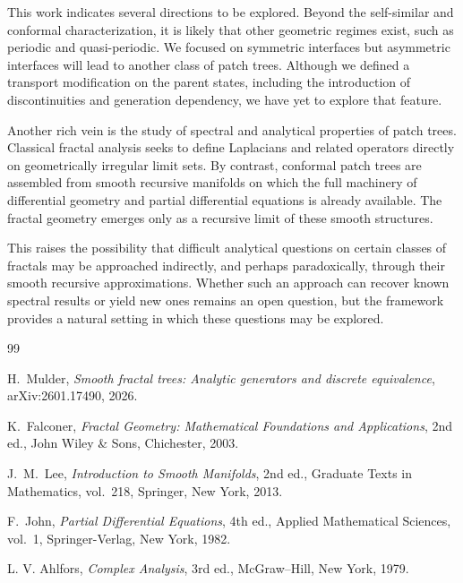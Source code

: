 \documentclass[11pt,a4paper]{article}
\begin{document}
This work indicates several directions to be explored. Beyond the self-similar and conformal
characterization, it is likely that other geometric regimes exist, such as periodic and 
quasi-periodic. We focused on symmetric interfaces but asymmetric interfaces will lead to another 
class of patch trees. Although we defined a transport modification on the parent states, 
including the introduction of discontinuities and generation dependency, we have yet to explore
that feature.

Another rich vein is the study of spectral and analytical
properties of patch trees. Classical fractal analysis seeks to define
Laplacians and related operators directly on geometrically irregular
limit sets. By contrast, conformal patch trees are assembled from
smooth recursive manifolds on which the full machinery of differential
geometry and partial differential equations is already available. The
fractal geometry emerges only as a recursive limit of these smooth
structures.

This raises the possibility that difficult analytical questions on
certain classes of fractals may be approached indirectly, and perhaps 
paradoxically, through their smooth recursive approximations. Whether 
such an approach can recover known spectral results or yield new ones 
remains an open question, but the framework provides a natural setting 
in which these questions may be explored.

\begin{thebibliography}{99}

H.\ Mulder,
\textit{Smooth fractal trees: Analytic generators and discrete
equivalence},
arXiv:2601.17490, 2026.

K.\ Falconer,
\textit{Fractal Geometry: Mathematical Foundations and Applications},
2nd ed.,
John Wiley \& Sons, Chichester, 2003.

J.\ M.\ Lee,
\textit{Introduction to Smooth Manifolds},
2nd ed.,
Graduate Texts in Mathematics, vol.\ 218,
Springer, New York, 2013.

F.\ John,
\textit{Partial Differential Equations},
4th ed.,
Applied Mathematical Sciences, vol.\ 1,
Springer-Verlag, New York, 1982.

L. V. Ahlfors,
\textit{Complex Analysis},
3rd ed.,
McGraw--Hill, New York, 1979.

\end{thebibliography}
\end{document}
